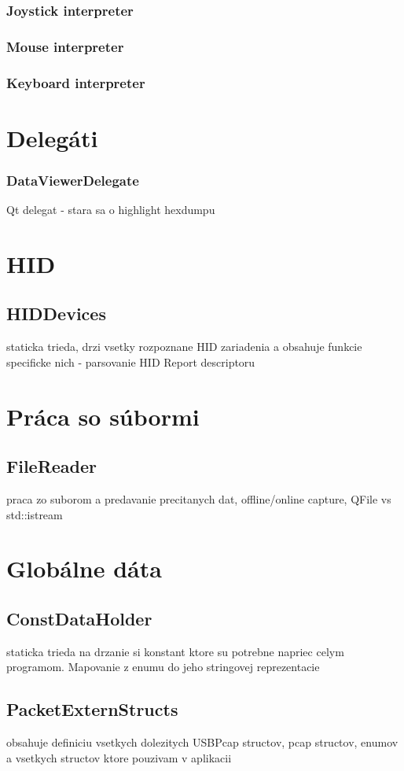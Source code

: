 \subsubsection{Joystick interpreter}
\subsubsection{Mouse interpreter}
\subsubsection{Keyboard interpreter}
\section{Delegáti}
\subsubsection{DataViewerDelegate}
Qt delegat - stara sa o highlight hexdumpu
\section{HID}
\subsection{HIDDevices}
staticka trieda, drzi vsetky rozpoznane HID zariadenia a obsahuje funkcie specificke nich - parsovanie HID Report descriptoru
\section{Práca so súbormi}
\subsection{FileReader}
praca zo suborom a predavanie precitanych dat, offline/online capture, QFile vs std::istream
\section{Globálne dáta}
\subsection{ConstDataHolder}
staticka trieda na drzanie si konstant ktore su potrebne napriec celym programom. Mapovanie z enumu do jeho stringovej reprezentacie
\subsection{PacketExternStructs}
obsahuje definiciu vsetkych dolezitych USBPcap structov, pcap structov, enumov a vsetkych structov ktore pouzivam v aplikacii











